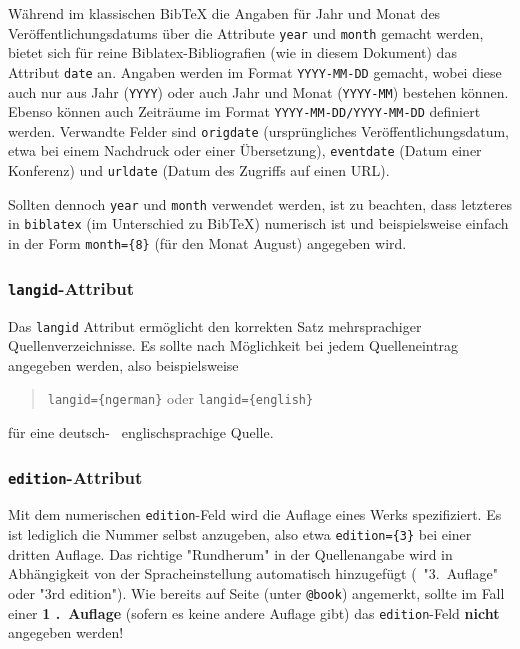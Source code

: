 Während im klassischen BibTeX die Angaben für Jahr und Monat des Veröffentlichungsdatums über die Attribute
\texttt{year} und \texttt{month} gemacht werden, bietet sich für reine Biblatex-Bibliografien (wie in diesem
Dokument) das Attribut \texttt{date} an. Angaben werden im Format \texttt{YYYY-MM-DD} gemacht, wobei diese auch nur
aus Jahr (\texttt{YYYY}) oder auch Jahr und Monat (\texttt{YYYY-MM}) bestehen können. Ebenso können auch Zeiträume im
Format \texttt{YYYY-MM-DD/YYYY-MM-DD} definiert werden. Verwandte Felder sind \texttt{origdate} (ursprüngliches
Veröffentlichungsdatum, etwa bei einem Nachdruck oder einer Übersetzung), \texttt{eventdate} (Datum einer Konferenz)
und \texttt{urldate} (Datum des Zugriffs auf einen URL).

Sollten dennoch \texttt{year} und \texttt{month} verwendet werden, ist zu beachten, dass letzteres in
\texttt{biblatex} (im Unterschied zu BibTeX) numerisch ist und beispielsweise einfach in der Form \verb!month={8}!
(für den Monat August) angegeben wird.


\subsubsection{\texttt{langid}-Attribut}

Das \texttt{langid} Attribut ermöglicht den korrekten Satz mehrsprachiger Quellenverzeichnisse. Es sollte nach
Möglichkeit bei jedem Quelleneintrag angegeben werden, also beispielsweise
\begin{quote}
\verb!langid={ngerman}! \quad oder \quad \verb!langid={english}!
\end{quote}
für eine deutsch- \bzw\ englischsprachige Quelle.


\subsubsection{\texttt{edition}-Attribut}

Mit dem numerischen \texttt{edition}-Feld wird die Auflage eines Werks spezifiziert. Es ist lediglich die Nummer
selbst anzugeben, also etwa \verb!edition={3}! bei einer dritten Auflage. Das richtige "Rundherum" in der
Quellenangabe wird in Abhängigkeit von der Spracheinstellung automatisch hinzugefügt (\zB\ "3.\ Auflage" oder "3rd
edition"). Wie bereits auf Seite \pageref{sec:@book} (unter \texttt{@book}) angemerkt, sollte im Fall einer \textbf{1
.~Auflage} (sofern es keine andere Auflage gibt) das \texttt{edition}-Feld \textbf{nicht} angegeben werden!


